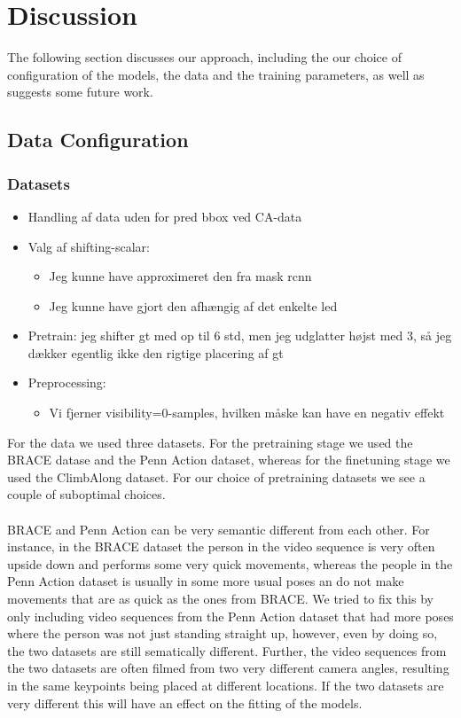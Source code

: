 \documentclass[./main.tex]{subfiles}
\begin{document}
\section{Discussion}
The following section discusses our approach, including the our choice of configuration of the models, the data and the training parameters, as well as suggests some future work.


\subsection{Data Configuration}
\subsubsection{Datasets}
\begin{itemize}
    \item Handling af data uden for pred bbox ved CA-data
    \item Valg af shifting-scalar:
    \begin{itemize}
        \item Jeg kunne have approximeret den fra mask rcnn
        \item Jeg kunne have gjort den afhængig af det enkelte led
    \end{itemize}
    \item Pretrain: jeg shifter gt med op til 6 std, men jeg udglatter højst med 3, så jeg dækker egentlig ikke den rigtige placering af gt
    \item Preprocessing:
    \begin{itemize}
        \item Vi fjerner visibility=0-samples, hvilken måske kan have en negativ effekt
    \end{itemize}
\end{itemize}
For the data we used three datasets. For the pretraining stage we used the BRACE datase and the Penn Action dataset, whereas for the finetuning stage we used the ClimbAlong dataset. For our choice of pretraining datasets we see a couple of suboptimal choices. 
\\
\\
BRACE and Penn Action can be very semantic different from each other. For instance, in the BRACE dataset the person in the video sequence is very often upside down and performs some very quick movements, whereas the people in the Penn Action dataset is usually in some more usual poses an do not make movements that are as quick as the ones from BRACE. We tried to fix this by only including video sequences from the Penn Action dataset that had more poses where the person was not just standing straight up, however, even by doing so, the two datasets are still sematically different. Further, the video sequences from the two datasets are often filmed from two very different camera angles, resulting in the same keypoints being placed at different locations. If the two datasets are very different this will have an effect on the fitting of the models.
\end{document}
